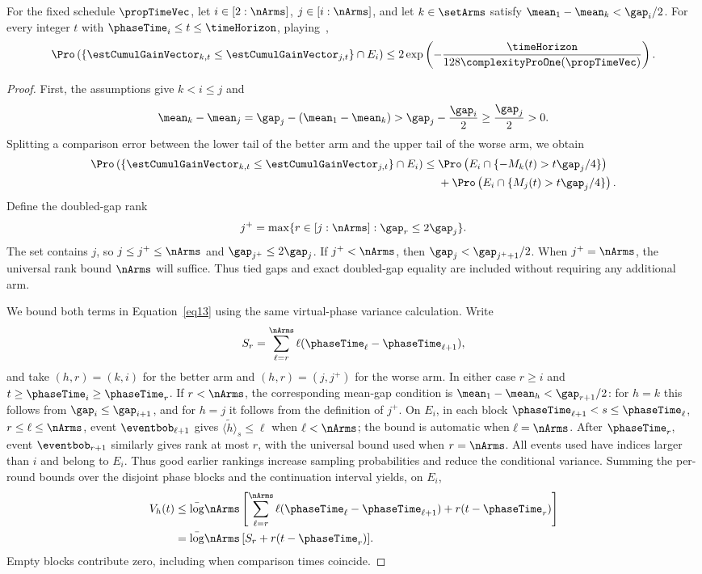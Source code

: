 \begin{lemma}\label{l:errTwoArms}
For the fixed schedule $\propTimeVec$, let $i\in[2:\nArms]$,
$j\in[i:\nArms]$, and let $k\in\setArms$ satisfy
$\mean_1-\mean_k<\gap_i/2$. For every integer $t$ with
$\phaseTime_i\leq t\leq\timeHorizon$, playing~\Pone{},
\[
\Pro\left(
\{\estCumulGainVector_{k,t}\leq\estCumulGainVector_{j,t}\}
\cap E_i\right)
\leq2\exp\left(-\frac{\timeHorizon}
{128\complexityProOne(\propTimeVec)}\right).
\]
\end{lemma}
\begin{proof}
First, the assumptions give $k<i\leq j$ and
\[
\mean_k-\mean_j
=\gap_j-(\mean_1-\mean_k)
>\gap_j-\frac{\gap_i}{2}
\geq\frac{\gap_j}{2}>0.
\]
Splitting a comparison error between the lower tail of the better
arm and the upper tail of the worse arm, we obtain
\begin{equation}\label{eq13}
\begin{split}
\Pro\left(
\{\estCumulGainVector_{k,t}\leq\estCumulGainVector_{j,t}\}
\cap E_i\right)
\leq{}&\Pro\left(E_i\cap\{-M_k(t)>t\gap_j/4\}\right)\\
&+\Pro\left(E_i\cap\{M_j(t)>t\gap_j/4\}\right).
\end{split}
\end{equation}
Define the doubled-gap rank
\[
j^+=\max\{r\in[j:\nArms]:\gap_r\leq2\gap_j\}.
\]
The set contains $j$, so $j\leq j^+\leq\nArms$ and
$\gap_{j^+}\leq2\gap_j$. If $j^+<\nArms$, then
$\gap_j<\gap_{j^++1}/2$. When $j^+=\nArms$, the universal rank
bound $\nArms$ will suffice. Thus tied gaps and exact doubled-gap
equality are included without requiring any additional arm.

We bound both terms in Equation~\ref{eq13} using the same
virtual-phase variance calculation. Write
\[
S_r=\sum_{\ell=r}^{\nArms}\ell(\phaseTime_\ell-\phaseTime_{\ell+1}),
\]
and take $(h,r)=(k,i)$ for the better arm and $(h,r)=(j,j^+)$
for the worse arm. In either case $r\geq i$ and
$t\geq\phaseTime_i\geq\phaseTime_r$.
If $r<\nArms$, the corresponding mean-gap condition is
$\mean_1-\mean_h<\gap_{r+1}/2$: for $h=k$ this follows from
$\gap_i\leq\gap_{i+1}$, and for $h=j$ it follows from the
definition of $j^+$.
On $E_i$, in each block
$\phaseTime_{\ell+1}<s\leq\phaseTime_\ell$, $r\leq\ell\leq\nArms$,
event $\eventbob_{\ell+1}$ gives
$\tilde{\langle h\rangle}_s\leq\ell$ when $\ell<\nArms$;
the bound is automatic when $\ell=\nArms$.
After $\phaseTime_r$, event $\eventbob_{r+1}$ similarly gives rank
at most $r$, with the universal bound used when $r=\nArms$.
All events used have indices larger than $i$ and belong to $E_i$.
Thus good earlier rankings increase sampling probabilities and
reduce the conditional variance. Summing the per-round bounds over
the disjoint phase blocks and the continuation interval yields,
on $E_i$,
\begin{align*}
V_h(t)
&\leq\bar\log\nArms\left[
\sum_{\ell=r}^{\nArms}\ell(\phaseTime_\ell-\phaseTime_{\ell+1})
+r(t-\phaseTime_r)\right]\\
&=\bar\log\nArms\,[S_r+r(t-\phaseTime_r)].
\end{align*}
Empty blocks contribute zero, including when comparison times coincide.


\end{proof}
